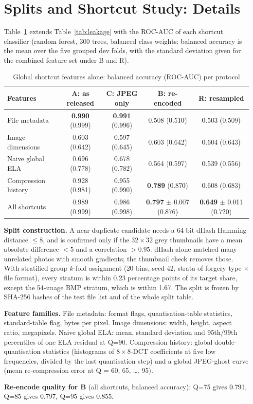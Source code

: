 \section{Splits and Shortcut Study: Details}\label{app:leakage}

Table~\ref{tab:leakage-full} extends Table~\ref{tab:leakage} with the ROC-AUC of each shortcut classifier (random
forest, 300 trees, balanced class weights; balanced accuracy is the mean over the five grouped dev folds, with the
standard deviation given for the combined feature set under B and R).

\begin{table}[h]
\centering
\caption{Global shortcut features alone: balanced accuracy (ROC-AUC) per protocol}\label{tab:leakage-full}
\footnotesize
\begin{tabular}{lcccc}
\toprule
Features & A: as released & C: JPEG only & B: re-encoded & R: resampled \\
\midrule
File metadata & \textbf{0.990} (0.999) & \textbf{0.991} (0.996) & 0.508 (0.510) & 0.503 (0.509) \\
Image dimensions & 0.603 (0.642) & 0.597 (0.645) & 0.603 (0.642) & 0.604 (0.643) \\
Naive global ELA & 0.696 (0.778) & 0.678 (0.782) & 0.564 (0.597) & 0.539 (0.556) \\
Compression history & 0.928 (0.981) & 0.955 (0.990) & \textbf{0.789} (0.870) & 0.608 (0.683) \\
All shortcuts & 0.989 (0.999) & 0.986 (0.998) & \textbf{0.797} $\pm$ 0.007 (0.876) & \textbf{0.649} $\pm$ 0.011 (0.720) \\
\bottomrule
\end{tabular}
\end{table}

\textbf{Split construction.} A near-duplicate candidate needs a 64-bit dHash Hamming distance $\leq 8$, and is
confirmed only if the $32\times32$ grey thumbnails have a mean absolute difference $<5$ and a correlation $>0.95$.
dHash alone matched many unrelated photos with smooth gradients; the thumbnail check removes those. With stratified
group $k$-fold assignment (20 bins, seed 42, strata of forgery type $\times$ file format), every stratum is within
0.23 percentage points of its target share, except the 54-image BMP stratum, which is within 1.67. The split is
frozen by SHA-256 hashes of the test file list and of the whole split table.

\textbf{Feature families.} File metadata: format flags, quantisation-table statistics, standard-table flag, bytes
per pixel. Image dimensions: width, height, aspect ratio, megapixels. Naive global ELA: mean, standard deviation
and 95th/99th percentiles of one ELA residual at Q=90. Compression history: global double-quantisation statistics
(histograms of $8\times8$-DCT coefficients at five low frequencies, divided by the last quantisation step) and a
global JPEG-ghost curve (mean re-compression error at Q = 60, 65, \ldots, 95).

\textbf{Re-encode quality for B} (all shortcuts, balanced accuracy): Q=75 gives 0.791, Q=85 gives 0.797, Q=95 gives
0.855.
